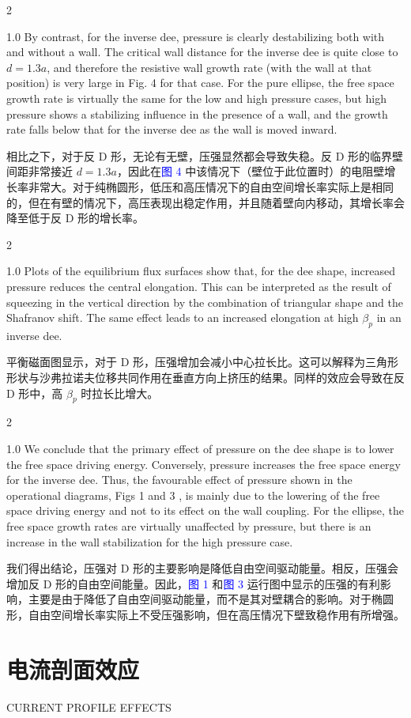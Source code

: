 \documentclass[utf8]{ctexart}
\newcommand\enzhbox[2]{
  	\quad\par \begin{paracol}{2} \colseprulecolor{black} 
  		\begin{spacing}{1.0}
  			\footnotesize  #1
  		\end{spacing}
  		\switchcolumn[1] 
  		#2
  	\end{paracol} \quad\par
  }
\begin{document}
\begin{sloppypar}
 
\enzhbox{  By contrast, for the inverse dee, pressure is clearly destabilizing both with and without a wall. The critical wall distance for the inverse dee is quite close to $d=1.3 a$, and therefore the resistive wall growth rate (with the wall at that position) is very large in Fig. 4 for that case. For the pure ellipse, the free space growth rate is virtually the same for the low and high pressure cases, but high pressure shows a stabilizing influence in the presence of a wall, and the growth rate falls below that for the inverse dee as the wall is moved inward.}{
相比之下，对于反 D 形，无论有无壁，压强显然都会导致失稳。反 D 形的临界壁间距非常接近 $d = 1.3a$，因此在\textcolor{blue}{图 4} 中该情况下（壁位于此位置时）的电阻壁增长率非常大。对于纯椭圆形，低压和高压情况下的自由空间增长率实际上是相同的，但在有壁的情况下，高压表现出稳定作用，并且随着壁向内移动，其增长率会降至低于反 D 形的增长率。 }
  
 
\enzhbox{  Plots of the equilibrium flux surfaces show that, for the dee shape, increased pressure reduces the central elongation. This can be interpreted as the result of squeezing in the vertical direction by the combination of triangular shape and the Shafranov shift. The same effect leads to an increased elongation at high $\beta_{p}$ in an inverse dee.}{
平衡磁面图显示，对于 D 形，压强增加会减小中心拉长比。这可以解释为三角形形状与沙弗拉诺夫位移共同作用在垂直方向上挤压的结果。同样的效应会导致在反 D 形中，高 $\beta_{p}$ 时拉长比增大。 }
  
 
 
\enzhbox{  We conclude that the primary effect of pressure on the dee shape is to lower the free space driving energy. Conversely, pressure increases the free space energy for the inverse dee. Thus, the favourable effect of pressure shown in the operational diagrams, Figs 1 and 3 , is mainly due to the lowering of the free space driving energy and not to its effect on the wall coupling. For the ellipse, the free space growth rates are virtually unaffected by pressure, but there is an increase in the wall stabilization for the high pressure case.}{
我们得出结论，压强对 D 形的主要影响是降低自由空间驱动能量。相反，压强会增加反 D 形的自由空间能量。因此，\textcolor{blue}{图 1} 和\textcolor{blue}{图 3} 运行图中显示的压强的有利影响，主要是由于降低了自由空间驱动能量，而不是其对壁耦合的影响。对于椭圆形，自由空间增长率实际上不受压强影响，但在高压情况下壁致稳作用有所增强。 }
  
 \section{电流剖面效应}
 {  \small CURRENT PROFILE EFFECTS \par }
 

\end{sloppypar}
\end{document}
